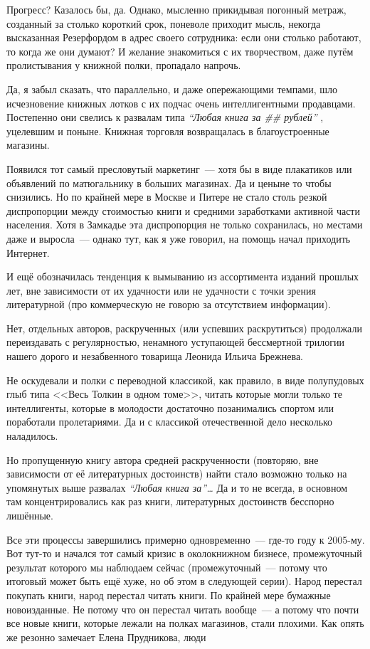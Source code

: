 Прогресс? Казалось бы, да. Однако, мысленно прикидывая погонный метраж, созданный за столько короткий срок, поневоле приходит мысль, некогда высказанная Резерфордом в адрес своего сотрудника: если они столько работают, то когда же они думают? И желание знакомиться с их творчеством, даже путём пролистывания у книжной полки, пропадало напрочь.

Да, я забыл сказать, что параллельно, и даже опережающими темпами, шло исчезновение книжных лотков с их подчас очень интеллигентными продавцами. Постепенно они свелись к развалам типа 
\textit{``Любая книга за \#\# рублей''}
, уцелевшим и поныне. Книжная торговля возвращалась в благоустроенные магазины.

Появился тот самый пресловутый маркетинг~--- хотя бы в виде плакатиков или объявлений по матюгальнику в больших магазинах. Да и цены не то чтобы снизились. Но по крайней мере в Москве и Питере не стало столь резкой диспропорции между стоимостью книги и средними заработками активной части населения. Хотя в Замкадье эта диспропорция не только сохранилась, но местами даже и выросла~--- однако тут, как я уже говорил, на помощь начал приходить Интернет.

И ещё обозначилась тенденция к вымыванию из ассортимента изданий прошлых лет, вне зависимости от их удачности или не удачности с точки зрения литературной (про коммерческую не говорю за отсутствием информации).

Нет, отдельных авторов, раскрученных (или успевших раскрутиться) продолжали переиздавать с регулярностью, ненамного уступающей бессмертной трилогии нашего дорого и незабвенного товарища Леонида Ильича Брежнева.

Не оскудевали и полки с переводной классикой, как правило, в виде полупудовых глыб типа <<Весь Толкин в одном томе>>, читать которые могли только те интеллигенты, которые в молодости достаточно позанимались спортом или поработали пролетариями. Да и с классикой отечественной дело несколько наладилось.

Но пропущенную книгу автора средней раскрученности (повторяю, вне зависимости от её литературных достоинств) найти стало возможно только на упомянутых выше развалах \textit{``Любая книга за''\dots}
 Да и то не всегда, в основном там концентрировались как раз книги, литературных достоинств бесспорно лишённые.

Все эти процессы завершились примерно одновременно~--- где-то году к 2005-му. Вот тут-то и начался тот самый кризис в околокнижном бизнесе, промежуточный результат которого мы наблюдаем сейчас (промежуточный~--- потому что итоговый может быть ещё хуже, но об этом в следующей серии). Народ перестал покупать книги, народ перестал читать книги. По крайней мере бумажные новоизданные. Не потому что он перестал читать вообще~--- а потому что почти все новые книги, которые лежали на полках магазинов, стали плохими. Как опять же резонно замечает Елена Прудникова, люди


